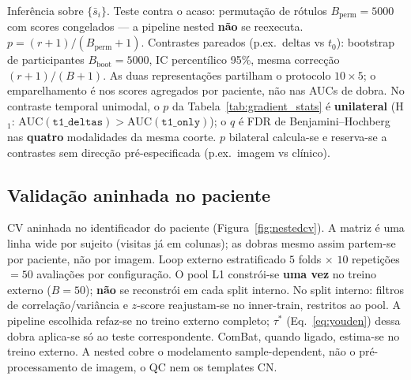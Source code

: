 \documentclass[review]{elsarticle}
\newcommand{\code}[1]{\texttt{#1}}
\begin{document}
	Inferência sobre $\{\bar{s}_i\}$.
	Teste contra o acaso: permutação de rótulos $B_{\mathrm{perm}}=5000$ com scores congelados --- a pipeline nested \textbf{não} se reexecuta.
	$p=(r+1)/(B_{\mathrm{perm}}+1)$.
	Contrastes pareados (p.ex.\ deltas vs $t_0$): bootstrap de participantes $B_{\mathrm{boot}}=5000$, IC percentílico 95\%, mesma correcção $(r+1)/(B+1)$.
	As duas representações partilham o protocolo $10\times 5$; o emparelhamento é nos scores agregados por paciente, não nas AUCs de dobra.
	No contraste temporal unimodal, o $p$ da Tabela~\ref{tab:gradient_stats} é \textbf{unilateral} (H$_1$: $\mathrm{AUC}(\code{t1\_deltas})>\mathrm{AUC}(\code{t1\_only})$); o $q$ é FDR de Benjamini--Hochberg nas \textbf{quatro} modalidades da mesma coorte.
	$p$ bilateral calcula-se e reserva-se a contrastes sem direcção pré-especificada (p.ex.\ imagem vs clínico).
	
	\subsection{Validação aninhada no paciente}
	\label{sec:modelagem}
	
	CV aninhada no identificador do paciente (Figura~\ref{fig:nestedcv}).
	A matriz é uma linha wide por sujeito (visitas já em colunas); as dobras mesmo assim partem-se por paciente, não por imagem.
	Loop externo estratificado $5$ folds $\times$ $10$ repetições $=50$ avaliações por configuração.
	O pool L1 constrói-se \textbf{uma vez} no treino externo ($B=50$); \textbf{não} se reconstrói em cada split interno.
	No split interno: filtros de correlação/variância e $z$-score reajustam-se no inner-train, restritos ao pool.
	A pipeline escolhida refaz-se no treino externo completo; $\tau^{*}$ (Eq.~\ref{eq:youden}) dessa dobra aplica-se só ao teste correspondente.
	ComBat, quando ligado, estima-se no treino externo.
	A nested cobre o modelamento sample-dependent, não o pré-processamento de imagem, o QC nem os templates CN.
	
	
\end{document}
